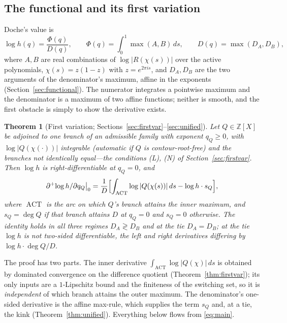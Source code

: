 \documentclass[11pt,reqno]{amsart}
\theoremstyle{plain}
\newtheorem{theorem}{Theorem}
\theoremstyle{definition}
\newcommand{\Z}{\mathbb{Z}}
\newcommand{\dplus}{\partial^{+}}
\newcommand{\dA}{D_A}
\newcommand{\dB}{D_B}
\DeclareMathOperator{\ACT}{ACT}
\begin{document}
\subsection*{The functional and its first variation}
Doche's value is
\begin{equation}\label{eq:ratio}
  \log h(q)=\frac{\Phi(q)}{D(q)},\qquad
  \Phi(q)=\int_0^1\max(A,B)\,ds,\qquad
  D(q)=\max(\dA,\dB),
\end{equation}
where $A,B$ are real combinations of $\log|R(\chi(s))|$ over the active polynomials,
$\chi(s)=z(1-z)$ with $z=e^{2\pi is}$, and $\dA,\dB$ are the two arguments of the
denominator's maximum, affine in the exponents (Section~\ref{sec:functional}). The
numerator integrates a pointwise maximum and the denominator is a maximum of two
affine functions; neither is smooth, and the first obstacle is simply to show the
derivative exists.

\begin{theorem}[First variation; Sections~\ref{sec:firstvar}--\ref{sec:unified}]
\label{thm:main}
Let $Q\in\Z[X]$ be adjoined to one branch of an admissible family with exponent
$q_Q\ge0$, with $\log|Q(\chi(\cdot))|$ integrable (automatic if $Q$ is contour-root-free)
and the branches not identically equal---the conditions \emph{(L)}, \emph{(N)} of
Section~\ref{sec:firstvar}. Then $\log h$ is right-differentiable at $q_Q=0$, and
\begin{equation}\label{eq:main}
  \dplus\!\log h/\partial q_Q\big|_0
  =\frac1D\Bigl[\int_{\ACT}\log|Q(\chi(s))|\,ds-\log h\cdot s_Q\Bigr],
\end{equation}
where $\ACT$ is the arc on which $Q$'s branch attains the inner maximum, and
$s_Q=\deg Q$ if that branch attains $D$ at $q_Q=0$ and $s_Q=0$ otherwise. The
identity holds in all three regimes $\dA\gtrless\dB$ and at the tie
$\dA=\dB$; at the tie $\log h$ is not two-sided differentiable, the left and
right derivatives differing by $\log h\cdot\deg Q/D$.
\end{theorem}

The proof has two parts. The inner derivative
$\int_{\ACT}\log|Q(\chi)|\,ds$ is obtained by dominated convergence on the difference
quotient (Theorem~\ref{thm:firstvar}); its only inputs are a $1$-Lipschitz bound and
the finiteness of the switching set, so it is \emph{independent} of which branch
attains the outer maximum. The denominator's one-sided derivative is the affine
max-rule, which supplies the term $s_Q$ and, at a tie, the kink
(Theorem~\ref{thm:unified}). Everything below flows from \eqref{eq:main}.
\end{document}
